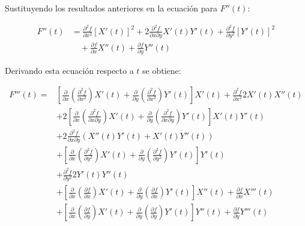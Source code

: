\documentclass{report}
\begin{document}
    Sustituyendo los resultados anteriores en la ecuación para $F''(t)$:

    \begin{align*}
    F''(t) &= \frac{\partial^2 f}{\partial x^2} \left[ X'(t) \right]^2 + 2 \frac{\partial^2 f}{\partial x \partial y} X'(t) Y'(t) + \frac{\partial^2 f}{\partial y^2} \left[ Y'(t) \right]^2 \\
    & \quad + \frac{\partial f}{\partial x} X''(t) + \frac{\partial f}{\partial y} Y''(t)
    \end{align*}

    Derivando esta ecuación respecto a $t$ se obtiene:

    \begin{align*}
    F'''(t) = & \left[ \frac{\partial}{\partial x} \left( \frac{\partial^2 f}{\partial x^2} \right) X'(t) + \frac{\partial}{\partial y} \left( \frac{\partial^2 f}{\partial x^2} \right) Y'(t) \right] X'(t) + \frac{\partial^2 f}{\partial x^2} 2 X'(t) X''(t) \\
    & + 2 \left[ \frac{\partial}{\partial x} \left( \frac{\partial^2 f}{\partial x \partial y} \right) X'(t) + \frac{\partial}{\partial y} \left( \frac{\partial^2 f}{\partial x \partial y} \right) Y'(t) \right] X'(t) Y'(t) \\
    & + 2 \frac{\partial^2 f}{\partial x \partial y} \left( X''(t) Y'(t) + X'(t) Y''(t) \right) \\
    & + \left[ \frac{\partial}{\partial x} \left( \frac{\partial^2 f}{\partial y^2} \right) X'(t) + \frac{\partial}{\partial y} \left( \frac{\partial^2 f}{\partial y^2} \right) Y'(t) \right] Y'(t) \\
    & + \frac{\partial^2 f}{\partial y^2} 2 Y'(t) Y''(t) \\
    & + \left[ \frac{\partial}{\partial x} \left( \frac{\partial f}{\partial x} \right) X'(t) + \frac{\partial}{\partial y} \left( \frac{\partial f}{\partial x} \right) Y'(t) \right] X''(t) + \frac{\partial f}{\partial x} X'''(t) \\
    & + \left[ \frac{\partial}{\partial x} \left( \frac{\partial f}{\partial y} \right) X'(t) + \frac{\partial}{\partial y} \left( \frac{\partial f}{\partial y} \right) Y'(t) \right] Y''(t) + \frac{\partial f}{\partial y} Y'''(t)
    \end{align*}
\end{document}
